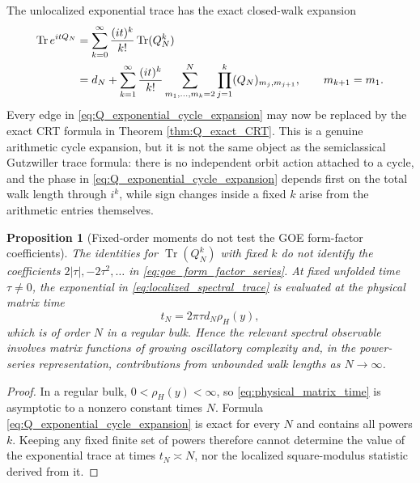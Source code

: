 \documentclass[11pt]{amsart}
\numberwithin{equation}{section}
\theoremstyle{plain}
\newtheorem{proposition}[theorem]{Proposition}
\theoremstyle{definition}
\theoremstyle{remark}
\newcommand{\Tr}{\operatorname{Tr}}
\begin{document}
The unlocalized exponential trace has the exact closed-walk expansion
\begin{align}
\Tr e^{itQ_N}
&=\sum_{k=0}^{\infty}\frac{(it)^k}{k!}\Tr(Q_N^k)\notag\\
&=d_N+
\sum_{k=1}^{\infty}\frac{(it)^k}{k!}
\sum_{m_1,\ldots,m_k=2}^{N}
\prod_{j=1}^{k}(Q_N)_{m_j,m_{j+1}},
\qquad m_{k+1}=m_1.
\label{eq:Q_exponential_cycle_expansion}
\end{align}
Every edge in \eqref{eq:Q_exponential_cycle_expansion} may now be replaced by the exact CRT formula in Theorem \ref{thm:Q_exact_CRT}.  This is a genuine arithmetic cycle expansion, but it is not the same object as the semiclassical Gutzwiller trace formula: there is no independent orbit action attached to a cycle, and the phase in \eqref{eq:Q_exponential_cycle_expansion} depends first on the total walk length through $i^k$, while sign changes inside a fixed $k$ arise from the arithmetic entries themselves.

\begin{proposition}[Fixed-order moments do not test the GOE form-factor coefficients]
\label{prop:fixed_moments_not_form_factor}
The identities for $\Tr(Q_N^k)$ with fixed $k$ do not identify the coefficients $2|\tau|,-2\tau^2,\ldots$ in \eqref{eq:goe_form_factor_series}.  At fixed unfolded time $\tau\ne0$, the exponential in \eqref{eq:localized_spectral_trace} is evaluated at the physical matrix time
\begin{equation}
t_N=2\pi\tau d_N\rho_H(y),
\label{eq:physical_matrix_time}
\end{equation}
which is of order $N$ in a regular bulk.  Hence the relevant spectral observable involves matrix functions of growing oscillatory complexity and, in the power-series representation, contributions from unbounded walk lengths as $N\to\infty$.
\end{proposition}

\begin{proof}
In a regular bulk, $0<\rho_H(y)<\infty$, so \eqref{eq:physical_matrix_time} is asymptotic to a nonzero constant times $N$.  Formula \eqref{eq:Q_exponential_cycle_expansion} is exact for every $N$ and contains all powers $k$.  Keeping any fixed finite set of powers therefore cannot determine the value of the exponential trace at times $t_N\asymp N$, nor the localized square-modulus statistic derived from it.
\end{proof}
\end{document}
